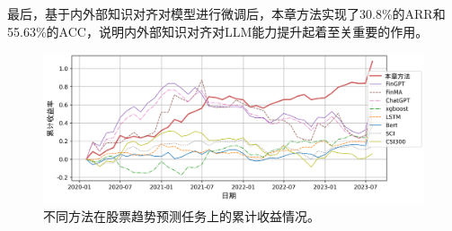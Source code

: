 最后，基于内外部知识对齐对模型进行微调后，本章方法实现了30.8\%的ARR和55.63\%的ACC，说明内外部知识对齐对LLM能力提升起着至关重要的作用。

\begin{figure}[htbp]
	\centering
	\includegraphics[scale=0.54]{Fig/stock_trend_exp.png}
	\caption{\label{stock_trend_exp}不同方法在股票趋势预测任务上的累计收益情况。}
\end{figure}

